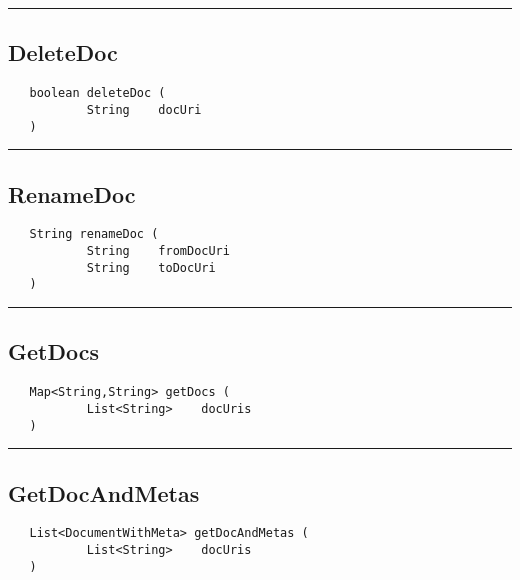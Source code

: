 \rule{15cm}{2pt}
\subsection{DeleteDoc}
\label{Api:DeleteDoc}
\begin{verbatim}
   boolean deleteDoc (
           String    docUri
   )
\end{verbatim}



\rule{15cm}{2pt}
\subsection{RenameDoc}
\label{Api:RenameDoc}
\begin{verbatim}
   String renameDoc (
           String    fromDocUri
           String    toDocUri
   )
\end{verbatim}



\rule{15cm}{2pt}
\subsection{GetDocs}
\label{Api:GetDocs}
\begin{verbatim}
   Map<String,String> getDocs (
           List<String>    docUris
   )
\end{verbatim}



\rule{15cm}{2pt}
\subsection{GetDocAndMetas}
\label{Api:GetDocAndMetas}
\begin{verbatim}
   List<DocumentWithMeta> getDocAndMetas (
           List<String>    docUris
   )
\end{verbatim}



